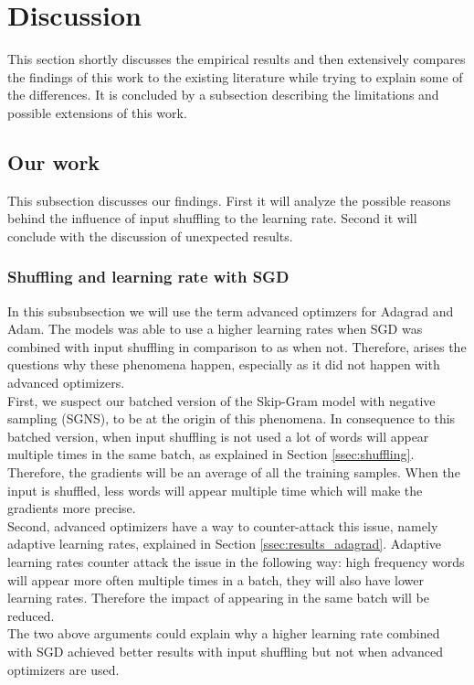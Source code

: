 \section{Discussion}\label{sec:discussion}

This section shortly discusses the empirical results and then extensively compares the findings of this work to the existing literature while trying to explain some of the differences. It is concluded by a subsection describing the limitations and possible extensions of this work. 

\subsection{Our work}
This subsection discusses our findings. First it will analyze the possible reasons behind the influence of input shuffling to the learning rate. Second it will conclude with the discussion of unexpected results. 

\subsubsection{Shuffling and learning rate with SGD}
In this subsubsection we will use the term advanced optimzers for Adagrad and Adam. The models was able to use a higher learning rates when SGD was combined with input shuffling in comparison to as when not. Therefore, arises the questions why these phenomena happen, especially as it did not happen with advanced optimizers.  \\
First, we suspect our batched version of the Skip-Gram model with negative sampling (SGNS), to be at the origin of this phenomena. In consequence to this batched version, when input shuffling is not used a lot of words will appear multiple times in the same batch, as explained in Section \ref{ssec:shuffling}. Therefore, the gradients will be an average of all the training samples. When the input is shuffled, less words will appear multiple time which will make the gradients more precise.\\
Second, advanced optimizers have a way to counter-attack this issue, namely adaptive learning rates, explained in Section \ref{ssec:results_adagrad}. Adaptive learning rates counter attack the issue in the following way: high frequency words  will appear more often multiple times in a batch, they will also have lower learning rates. Therefore the impact of appearing in the same batch will be reduced. \\  The two above arguments could explain why a higher learning rate combined with SGD achieved better results with input shuffling but not when advanced optimizers are used. 

